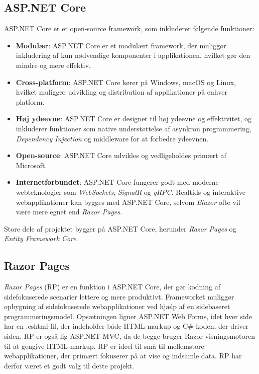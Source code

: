 \subsection{ASP.NET Core}
ASP.NET Core er et open-source framework, som inkluderer følgende funktioner:
\begin{itemize}
\item \textbf{Modulær}: ASP.NET Core er et modulært framework, der muliggør inkludering af kun nødvendige komponenter i applikationen, hvilket gør den mindre og mere effektiv.
\item \textbf{Cross-platform}: ASP.NET Core kører på Windows, macOS og Linux, hvilket muliggør udvikling og distribution af applikationer på enhver platform.
\item \textbf{Høj ydeevne}: ASP.NET Core er designet til høj ydeevne og effektivitet, og inkluderer funktioner som native understøttelse af asynkron programmering, \emph{Dependency Injection} og middleware for at forbedre ydeevnen.
\item \textbf{Open-source}: ASP.NET Core udvikles og vedligeholdes primært af Microsoft.
\item \textbf{Internetforbundet}: ASP.NET Core fungerer godt med moderne webteknologier som \emph{WebSockets}, \emph{SignalR} og \emph{gRPC}. Realtids og interaktive webapplikationer kan bygges med ASP.NET Core, selvom \emph{Blazor} ofte vil være mere egnet end \emph{Razor Pages}.
\end{itemize}
Store dele af projektet bygger på ASP.NET Core, herunder \emph{Razor Pages} og \emph{Entity Framework Core}.

\subsection{Razor Pages}
\emph{Razor Pages} (RP) er en funktion i ASP.NET Core, der gør kodning af sidefokuserede scenarier lettere og mere produktivt. Frameworket muliggør opbygning af sidefokuserede webapplikationer ved hjælp af en sidebaseret programmeringsmodel. Opsætningen ligner ASP.NET Web Forms, idet hver side har en .cshtml-fil, der indeholder både HTML-markup og C\#-koden, der driver siden. RP er også lig ASP.NET MVC, da de begge bruger Razor-visningsmotoren til at gengive HTML-markup. RP er ideel til små til mellemstore webapplikationer, der primært fokuserer på at vise og indsamle data. RP har derfor været et godt valg til dette projekt.


